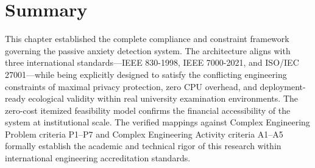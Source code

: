 \section{Summary}
\label{sec:ch5_summary}
This chapter established the complete compliance and constraint framework governing the passive anxiety detection system. The architecture aligns with three international standards—IEEE 830-1998, IEEE 7000-2021, and ISO/IEC 27001—while being explicitly designed to satisfy the conflicting engineering constraints of maximal privacy protection, zero CPU overhead, and deployment-ready ecological validity within real university examination environments. The zero-cost itemized feasibility model confirms the financial accessibility of the system at institutional scale. The verified mappings against Complex Engineering Problem criteria P1--P7 and Complex Engineering Activity criteria A1--A5 formally establish the academic and technical rigor of this research within international engineering accreditation standards.